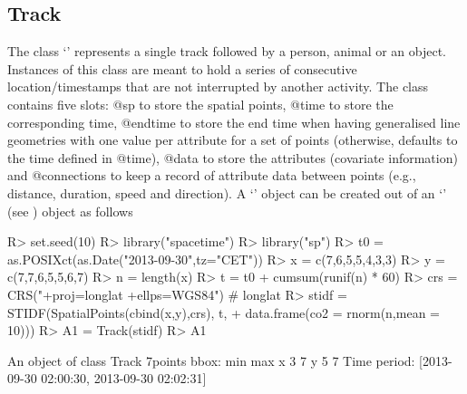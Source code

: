 \documentclass[article]{jss}
\newcommand{\class}[1]{`\code{#1}'}
\begin{document}
\subsection{Track}
The class \class{Track} represents a single track followed by a person, animal or an object. Instances of this class are meant to hold a series of consecutive location/timestamps that are not interrupted by another activity. The class contains five slots: @sp to store the spatial points, @time to store the corresponding time, @endtime to store the end time when having generalised line geometries with one value per attribute for a set of points (otherwise, defaults to the time defined in @time), @data to store the attributes (covariate information) and @connections to keep a record of attribute data between points (e.g., distance, duration, speed and direction). A \class{Track} object can be created out of an \class{STIDF} (see \cite{spacetime}) object as follows
\begin{Sinput}
R> set.seed(10)
R> library("spacetime")
R> library("sp")
R> t0 = as.POSIXct(as.Date("2013-09-30",tz="CET"))
R> x = c(7,6,5,5,4,3,3)
R> y = c(7,7,6,5,5,6,7)
R> n = length(x)
R> t = t0 + cumsum(runif(n) * 60)
R> crs = CRS("+proj=longlat +ellps=WGS84") # longlat
R> stidf = STIDF(SpatialPoints(cbind(x,y),crs), t, 
+                  data.frame(co2 = rnorm(n,mean = 10)))
R> A1 = Track(stidf)
R> A1
\end{Sinput}
\begin{Soutput}
An object of class Track 
7points 
bbox: 
  min max
x   3   7
y   5   7
Time period: [2013-09-30 02:00:30, 2013-09-30 02:02:31]
\end{Soutput}
\end{document}
